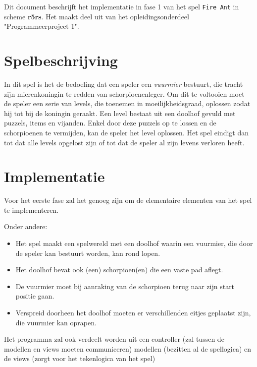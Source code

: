 Dit document beschrijft het implementatie in fase 1 van het spel \texttt{Fire Ant} in scheme \textbf{r5rs}.
Het maakt deel uit van het opleidingsonderdeel "Programmeerproject 1".

\section{Spelbeschrijving}
In dit spel is het de bedoeling dat een speler een \textit{vuurmier} bestuurt,
die tracht zijn mierenkoningin te redden van schorpioenenleger.
Om dit te voltooien moet de speler een serie van levels, die toenemen in moeilijkheidsgraad,
oplossen zodat hij tot bij de koningin geraakt.
Een level bestaat uit een doolhof gevuld met puzzels, items en vijanden.
Enkel door deze puzzels op te lossen en de schorpioenen te vermijden, kan de speler het level oplossen.
Het spel eindigt dan tot dat alle levels opgelost zijn of tot dat de speler al zijn levens verloren heeft.

\section{Implementatie}
Voor het eerste fase zal het genoeg zijn om de elementaire elementen van het spel te implementeren.

Onder andere:
\begin{itemize}
	\item Het spel maakt een spelwereld met een doolhof waarin een vuurmier, die door de speler kan bestuurt worden, kan rond lopen.
	\item Het doolhof bevat ook (een) schorpioen(en) die een vaste pad aflegt.
	\item	De vuurmier moet bij aanraking van de schorpioen terug naar zijn start positie gaan.
	\item Verspreid doorheen het doolhof moeten er verschillenden eitjes geplaatst zijn,
		die vuurmier kan oprapen.
\end{itemize}

Het programma zal ook verdeelt worden uit
een controller (zal tussen de modellen en views moeten communiceren)
modellen (bezitten al de spellogica)
en de views (zorgt voor het tekenlogica van het spel)
